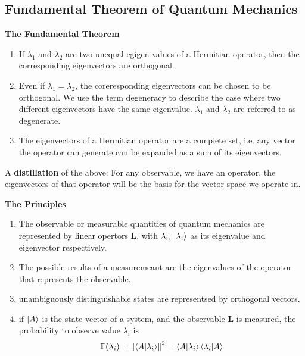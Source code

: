 \documentclass[a4paper]{article}
\begin{document}
\subsection{Fundamental Theorem of Quantum Mechanics}
\begin{flushleft}
    \textbf{The Fundamental Theorem}
\end{flushleft}
\begin{enumerate}
    \item If $\lambda_1$ and $\lambda_2$ are two unequal egigen values of a Hermitian operator, then the corresponding eigenvectors are orthogonal.
    \item Even if $\lambda_1 = \lambda_2$, the coreresponding eigenvectors can be chosen to be orthogonal. We use the term degeneracy to describe the case where two different eigenvectors have the same eigenvalue. $\lambda_1$ and $\lambda_2$ are referred to as degenerate.
    \item The eigenvectors of a Hermitian operator are a complete set, i.e. any vector the operator can generate can be expanded as a sum of its eigenvectors.
\end{enumerate}

\par A \textbf{distillation} of the above: For any observable, we have an operator, the eigenvectors of that operator will be the basis for the vector space we operate in.

\begin{flushleft}
    \textbf{The Principles}
\end{flushleft}
\begin{enumerate}
    \item The observable or measurable quantities of quantum mechanics are represented by linear opertors $\mathbf{L}$, with $\lambda_i,\, \ket{\lambda_i}$ as its eigenvalue and eigenvector respectively.
    \item The possible results of a measuremeant are the eigenvalues of the operator that represents the observable.
    \item unambiguously distinguishable states are representsed by orthogonal vectors.
    \item if $\ket{A}$ is the state-vector of a system, and the observable $\mathbf{L}$ is measured, the probability to observe value $\lambda_i$ is 
    \[
        \mathbb{P}(\lambda_i) = \norm{\bra{A}\ket{\lambda_i}}^2=\bra{A}\ket{\lambda_i}\bra{\lambda_i}\ket{A}    
    \]
\end{enumerate}
\end{document}
